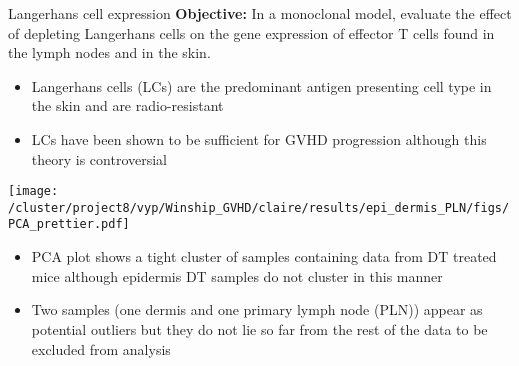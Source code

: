 \documentclass[final,hyperref={pdfpagelabels=false}]{beamer}
\begin{document}
\begin{frame}{}
\begin{columns}[t]
      \begin{column}{.40\linewidth}
        \begin{block}{Langerhans cell expression}
	  {\bf Objective:} In a monoclonal model, evaluate the effect of depleting Langerhans cells on the gene expression of effector T cells found in the lymph nodes and in the skin.

 {\small	\begin{itemize} %
	\item Langerhans cells (LCs) are the predominant antigen presenting cell type in the skin and are radio-resistant  
	\item LCs have been shown to be sufficient for GVHD progression although this theory is controversial  
\end{itemize}}



\hfill

 \begin{minipage}{0.45\textwidth}
           \texttt{[image: /cluster/project8/vyp/Winship\_GVHD/claire/results/epi\_dermis\_PLN/figs/PCA\_prettier.pdf]}
          \end{minipage}

{\small
          \begin{itemize}
          \item PCA plot shows a tight cluster of samples containing data from DT treated mice although epidermis DT samples do not cluster in this manner
          \item Two samples (one dermis and one primary lymph node (PLN)) appear as potential outliers but they do not lie so far from the rest of the data to be excluded from analysis
          \end{itemize}}


\end{block}
\end{column}
\end{columns}
\end{frame}
\end{document}
